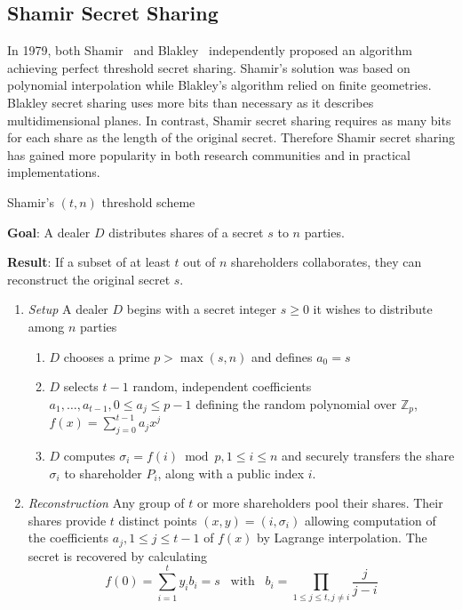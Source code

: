 \subsection{Shamir Secret Sharing}
In 1979, both Shamir~\cite{art:Shamir79} and Blakley~\cite{art:Blakley79} independently proposed an algorithm achieving perfect threshold secret sharing. Shamir's solution was based on polynomial interpolation while Blakley's algorithm relied on finite geometries. Blakley secret sharing uses more bits than necessary as it describes multidimensional planes. In contrast, Shamir secret sharing requires as many bits for each share as the length of the original secret. Therefore Shamir secret sharing has gained more popularity in both research communities and in practical implementations.

\begin{algorithm}
\caption{Shamir's $\left( t, n \right)$ threshold scheme~\cite{book:handbook_of_applied_cryptography} }
\label{alg:shamirs_threshold_sheme}
\begin{description}
 \item \textbf{Goal}: A dealer $D$ distributes shares of a secret $s$ to $n$ parties.
 
 \item \textbf{Result}: If a subset of at least $t$ out of $n$ shareholders collaborates, they can reconstruct the original secret $s$.
\end{description}

 \begin{enumerate}
  \item \textit{Setup} A dealer $D$ begins with a secret integer $s \geq 0$ it wishes to distribute among $n$ parties
   \begin{enumerate}
    \item $D$ chooses a prime $p > \max \left( s, n \right)$ and defines $a_0 = s$
    \item $D$ selects $t-1$ random, independent coefficients $a_1, \ldots, a_{t-1}, 0 \leq a_j \leq p-1$ defining the random polynomial over $\mathbb{Z}_p$, $f \left( x \right) = \sum^{t-1}_{j=0} a_j x^j$
    \item $D$ computes $\sigma_i = f \left( i \right) \bmod p, 1 \leq i \leq n$ and securely transfers the share $\sigma_i$ to shareholder $P_i$, along with a public index $i$.
   \end{enumerate}
   \item \textit{Reconstruction} Any group of $t$ or more shareholders pool their shares. Their shares provide $t$ distinct points $\left( x, y \right) = \left( i, \sigma_i \right)$ allowing computation of the coefficients $a_j, 1 \leq j \leq t-1$ of $f \left( x \right)$ by Lagrange interpolation. The secret is recovered by calculating
 \begin{equation*}
  f \left( 0 \right) = \sum^t_{i=1}y_i b_i = s \; \; \; \textrm{with} \; \; \; b_i = \prod_{1 \leq j \leq t, j \neq i} \frac{j}{j-i}
 \end{equation*}
 \end{enumerate}
\end{algorithm}

